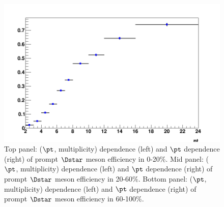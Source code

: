 \begin{figure}[h]
	\includegraphics[width=.48\linewidth]{figuresVsCent/Dstar/EffAndFeed/EfficiencyMap_1D_DStar_c_60100_ZNA_wLimAcc_Plot.png}
	\caption{Top panel: ($\pt$, multiplicity) dependence (left) and $\pt$ dependence (right) of prompt $\Dstar$ meson efficiency in 0-20$\%$. Mid panel: ($\pt$, multiplicity) dependence (left) and $\pt$ dependence (right) of prompt $\Dstar$ meson efficiency in 20-60$\%$.
Bottom panel: ($\pt$, multiplicity) dependence (left) and $\pt$ dependence (right) of prompt $\Dstar$ meson efficiency in 60-100$\%$.}
	\label{fig:dstarEff}	
\end{figure}

